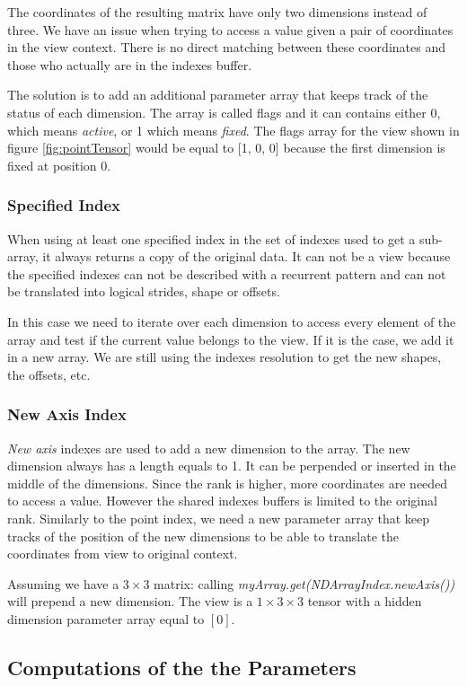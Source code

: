 The coordinates of the resulting matrix have only two dimensions instead of three. We have an issue when trying to access a value given a pair of coordinates in the view context. There is no direct matching between these coordinates and those who actually are in the indexes buffer. 

The solution is to add an additional parameter array that keeps track of the status of each dimension. 
The array is called flags and it can contains either 0, which means \textit{active}, or 1 which means \textit{fixed}. The flags array for the view shown in figure \ref{fig:pointTensor} would be equal to [1, 0, 0] because the first dimension is fixed at position 0.

\subsubsection{Specified Index}
When using at least one specified index in the set of indexes used to get a sub-array, it always returns a copy of the original data. It can not be a view because the specified indexes can not be described with a recurrent pattern and can not be translated into logical strides, shape or offsets.

In this case we need to iterate over each dimension to access every element of the array and test if the current value belongs to the view. If it is the case, we add it in a new array. We are still using the indexes resolution to get the new shapes, the offsets, etc.


\subsubsection{New Axis Index}
\textit{New axis} indexes are used to add a new dimension to the array. The new dimension always has a length equals to 1. It can be perpended or inserted in the middle of the dimensions.
Since the rank is higher, more coordinates are needed to access a value. However the shared indexes buffers is limited to the original rank. Similarly to the point index, we need a new parameter array that keep tracks of the position of the new dimensions to be able to  translate the coordinates from view to original context.

Assuming we have a $3\times 3$ matrix: calling \textit{myArray.get(NDArrayIndex.newAxis())} will prepend a new dimension. The view is a $1\times 3\times 3$ tensor with a hidden dimension parameter array equal to $[0]$.


\subsection{Computations of the the Parameters}
